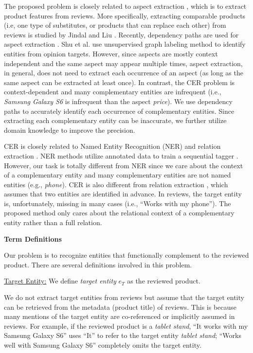 The proposed problem is closely related to aspect extraction \cite{hu2004mining,popescu2007extracting,qiu2011opinion,liu2015sentiment}, which is to extract product features from reviews. More specifically, extracting comparable products (i.e, one type of substitutes, or products that can replace each other) from reviews is studied by Jindal and Liu \cite{jindal2006mining}. Recently, dependency paths \cite{kubler2009dependency} are used for aspect extraction \cite{qiu2011opinion,liu2015automated}. Shu et al. \cite{shu2016lifelong} use unsupervised graph labeling method to identify entities from opinion targets. However, since aspects are mostly context independent and the same aspect may appear multiple times, aspect extraction, in general, does not need to extract each occurrence of an aspect (as long as the same aspect can be extracted at least once). In contrast, the CER problem is context-dependent and many complementary entities are infrequent (i.e., \textit{Samsung Galaxy S6} is infrequent than the aspect \textit{price}). We use dependency paths to accurately identify each occurrence of complementary entities. Since extracting each complementary entity can be inaccurate, we further utilize domain knowledge to improve the precision. 

CER is closely related to Named Entity Recognition (NER)\cite{nadeau2007survey} and relation extraction \cite{bach2007review}. NER methods utilize annotated data to train a sequential tagger \cite{rabiner1986introduction,mccallum2000maximum}. However, our task is totally different from NER since we care about the context of a complementary entity and many complementary entities are not named entities (e.g., \textit{phone}). CER is also different from relation extraction \cite{bach2007review,culotta2004dependency,mintz2009distant,bunescu2005shortest}, which assumes that two entities are identified in advance. In reviews, the target entity is, unfortunately, missing in many cases (i.e., ``Works with my phone''). The proposed method only cares about the relational context of a complementary entity rather than a full relation.

\textbf{Term Definitions}
\label{sec:prelim}

Our problem is to recognize entities that functionally complement to the reviewed product. There are several definitions involved in this problem.

\underline{Target Entity:} \label{defn:te}
We define \emph{target entity} $e_T$ as the reviewed product.

We do not extract target entities from reviews but assume that the target entity can be retrieved from the metadata (product title) of reviews. This is because many mentions of the target entity are co-referenced or implicitly assumed in reviews. For example, if the reviewed product is a \textit{tablet stand}, ``It works with my Samsung Galaxy S6'' uses ``It'' to refer to the target entity \textit{tablet stand}; ``Works well with Samsung Galaxy S6'' completely omits the target entity.

